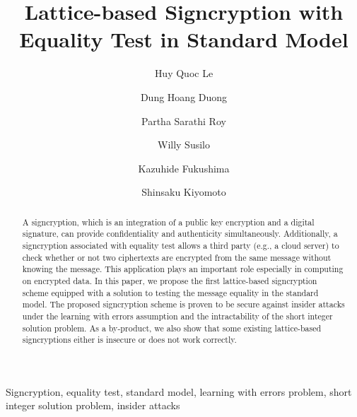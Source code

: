 \documentclass[a4paper,11pt,onecolumn]{elsarticle}
\begin{document}
	
	\title{Lattice-based Signcryption with Equality Test  in Standard Model}
	
	\author[1]{Huy Quoc Le}
	\author[1]{Dung Hoang Duong}
	\author[1]{Partha Sarathi Roy}
	\author[1]{Willy Susilo}
	\address[1]{ Institute of Cybersecurity and Cryptology, School of Computing and Information Technology, University of Wollongong,
		Northfields Avenue, Wollongong NSW 2522, Australia}
	
	
	\author[2]{Kazuhide Fukushima}
	\author[2]{Shinsaku Kiyomoto}
	\address[2]{Information Security Laboratory, KDDI Research, Inc.,\\
		2-1-15 Ohara, Fujimino-shi, Saitama, 356-8502, Japan}
	
	
	
	\begin{abstract}
	A signcryption, which is an integration of a public key encryption and a digital signature, can provide confidentiality and authenticity simultaneously. Additionally, a signcryption associated with equality test allows a third party (e.g., a cloud server) to check whether or not two ciphertexts are encrypted from the same message without knowing the message. This application plays an important role especially in computing on encrypted data. In this paper, we propose the first lattice-based signcryption scheme equipped with a solution to testing the message equality in the standard model. The proposed signcryption scheme is proven to be secure against insider attacks under the learning with errors  assumption and the intractability of the short integer solution  problem.  As a by-product,  we also show that some existing lattice-based signcryptions  either is insecure or  does not work correctly. 
	\end{abstract}
	
	\begin{keyword}
	Signcryption, equality test,  standard model, learning with errors problem, short integer solution problem, insider attacks
	\end{keyword}
	
	
	
\end{document}
